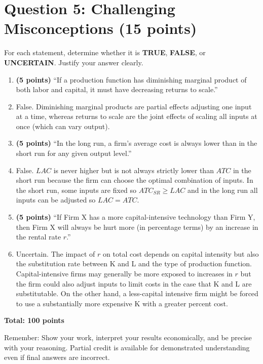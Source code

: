 \documentclass[11pt]{article}
\begin{document}
\section*{Question 5: Challenging Misconceptions (15 points)}

For each statement, determine whether it is \textbf{TRUE}, \textbf{FALSE}, or \textbf{UNCERTAIN}. Justify your answer clearly.

\begin{enumerate}[label=(\alph*)]
    \item \textbf{(5 points)} ``If a production function has diminishing marginal product of both labor and capital, it must have decreasing returns to scale.''
    \item[] False. Diminishing marginal products are partial effects adjusting one input at a time, whereas returns to scale are the joint effects of scaling all inputs at once (which can vary output).

    \item \textbf{(5 points)} ``In the long run, a firm’s average cost is always lower than in the short run for any given output level.''
    \item[] False. $LAC$ is never higher but is not always strictly lower than $ATC$ in the short run because the firm can choose the optimal combination of inputs. In the short run, some inputs are fixed so $ATC_{SR}\geq LAC$ and in the long run all inputs can be adjusted so $LAC=ATC$.

    \item \textbf{(5 points)} ``If Firm X has a more capital-intensive technology than Firm Y, then Firm X will always be hurt more (in percentage terms) by an increase in the rental rate $r$.'' 
    \item[] Uncertain. The impact of $r$ on total cost depends on capital intensity but also the substitution rate between K and L and the type of production function. Capital-intensive firms may generally be more exposed to increases in $r$ but the firm could also adjust inputs to limit costs in the case that K and L are substitutable. On the other hand, a less-capital intensive firm might be forced to use a substantially more expensive K with a greater percent cost.
\end{enumerate}

\vspace{1em}
\noindent \textbf{Total: 100 points}

\vspace{1em}
\noindent Remember: Show your work, interpret your results economically, and be precise with your reasoning. Partial credit is available for demonstrated understanding even if final answers are incorrect.
\end{document}
